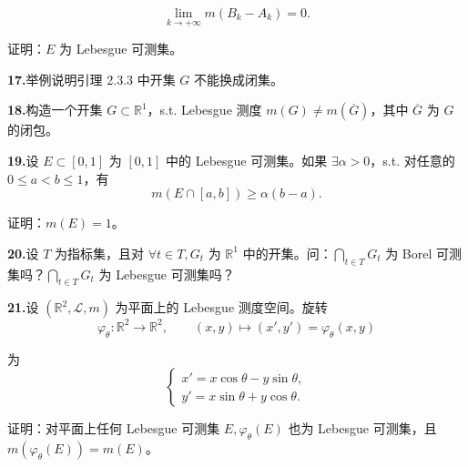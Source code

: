 \documentclass[11pt,a4paper]{article}
\begin{document}
\[\lim_{k\to+\infty}m(B_k-A_k)=0.\]
\par\noindent 证明：$E$ 为 Lebesgue 可测集。
\par{}\noindent\textbf{17.}\quad 举例说明引理 2.3.3 中开集 $G$ 不能换成闭集。
\par{}\noindent\textbf{18.}\quad 构造一个开集 $G\subset\mathbb R^1$，s.t. Lebesgue 测度 $m(G)\ne m(\overline G)$，其中 $\overline G$ 为 $G$ 的闭包。
\par{}\noindent\textbf{19.}\quad 设 $E\subset[0,1]$ 为 $[0,1]$ 中的 Lebesgue 可测集。如果 $\exists\alpha>0$，s.t. 对任意的 $0\leq a<b\leq1$，有
\[m(E\cap[a,b])\geq\alpha(b-a).\]
\par\noindent 证明：$m(E)=1$。
\par{}\noindent\textbf{20.}\quad 设 $T$ 为指标集，且对 $\forall t\in T,G_t$ 为 $\mathbb R^1$ 中的开集。问：$\bigcap_{t\in T}G_t$ 为 Borel 可测集吗？$\bigcap_{t\in T}G_t$ 为 Lebesgue 可测集吗？
\par{}\noindent\textbf{21.}\quad 设 $(\mathbb R^2,\mathcal L,m)$ 为平面上的 Lebesgue 测度空间。旋转
\[\varphi_\theta:\mathbb R^2\to\mathbb R^2,\qquad(x,y)\mapsto(x',y')=\varphi_\theta(x,y)\]
\par\noindent 为
\[\begin{cases}x'=x\cos\theta-y\sin\theta,\\ y'=x\sin\theta+y\cos\theta.\end{cases}\]
\par\noindent 证明：对平面上任何 Lebesgue 可测集 $E,\varphi_\theta(E)$ 也为 Lebesgue 可测集，且 $m(\varphi_\theta(E))=m(E)$。
\end{document}
